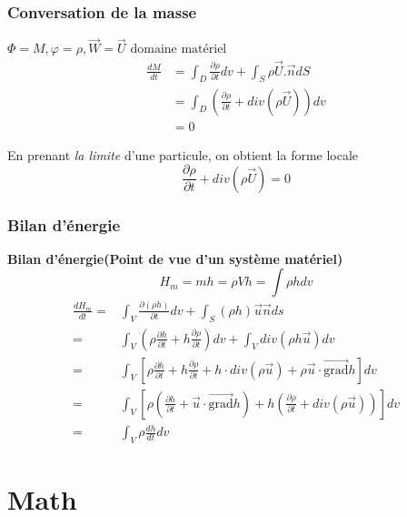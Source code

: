 \documentclass[openany]{book}
\begin{document}
\subsubsection{Conversation de la masse}
\begin{example}
 $\Phi = M,\varphi=\rho,\vec{ W}=\vec{ U}\text{ domaine mat\'eriel}$
\begin{equation}
	\begin{split}
\frac{ dM}{dt} & =\int_D \frac{\partial \rho}{\partial t}dv+ \int_S \rho \vec{ U}.\vec{ n}dS \\
& = \int_D (\frac{\partial \rho }{\partial t} + div(\rho \vec{ U}))dv \\
& =0	
	\end{split}
\end{equation}

En prenant \emph{la limite} d'une particule, on obtient la forme locale
$$
\frac{\partial \rho }{\partial t} + div(\rho \vec{ U})=0
$$
\end{example}
\subsubsection{Bilan d'\'energie}
\begin{example}
 \textbf{Bilan d'\'energie(Point de vue d'un syst\`eme mat\'eriel)}
 $$H_m = mh=\rho V h=\int \rho h dv$$
 \begin{equation}
 	\begin{split}
	 \frac{ dH_m}{dt}
	 = & \int_V \frac{\partial (\rho h)}{\partial t}dv+ \int_S (\rho h)\vec{u}\vec{n}ds \\
	 = & \int_V (\rho \frac{\partial h}{\partial t}+ h \frac{ \partial \rho}{\partial t})dv+ \int_V div(\rho h\vec{u})dv \\
	 = & \int_V [\rho \frac{\partial h}{\partial t}+ h \frac{ \partial \rho}{\partial t}+ h\cdot div(\rho \vec{u}) +\rho\vec{u}\cdot \vec{\mbox{grad}} h]dv \\
	 = & \int_V [\rho ( \frac{\partial h}{\partial t} + \vec{u}\cdot \vec{\mbox{grad}} h )+ h (\frac{ \partial \rho}{\partial t}+ div(\rho \vec{u}))]dv \\
	 = & \int_V \rho \frac{ dh}{dt}dv
	\end{split}
\end{equation}
\end{example}
\section{Math}
\end{document}
